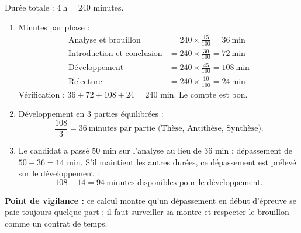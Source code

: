 \documentclass[11pt]{article}
\begin{document}
\begin{corrige}
Durée totale : $4\ \text{h} = 240$ minutes.
\begin{enumerate}
\item Minutes par phase :
\begin{align*}
\text{Analyse et brouillon} &= 240 \times \frac{15}{100} = 36\ \text{min} \\
\text{Introduction et conclusion} &= 240 \times \frac{30}{100} = 72\ \text{min} \\
\text{Développement} &= 240 \times \frac{45}{100} = 108\ \text{min} \\
\text{Relecture} &= 240 \times \frac{10}{100} = 24\ \text{min}
\end{align*}
Vérification : $36 + 72 + 108 + 24 = 240$ min. Le compte est bon.
\item Développement en 3 parties équilibrées :
\[ \frac{108}{3} = 36\ \text{minutes par partie (Thèse, Antithèse, Synthèse).} \]
\item Le candidat a passé $50$ min sur l'analyse au lieu de $36$ min : dépassement de $50 - 36 = 14$ min. S'il maintient les autres durées, ce dépassement est prélevé sur le développement :
\[ 108 - 14 = 94\ \text{minutes disponibles pour le développement.} \]
\end{enumerate}
\textbf{Point de vigilance :} ce calcul montre qu'un dépassement en début d'épreuve se paie toujours quelque part ; il faut surveiller sa montre et respecter le brouillon comme un contrat de temps.
\end{corrige}
\end{document}
